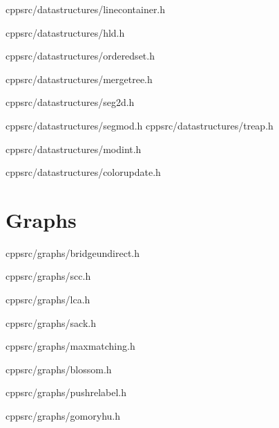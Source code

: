 \documentclass[portrait, 8pt, a4paper, oneside, twocolumn]{extarticle}
\begin{document}
    {}
    {}
    {cpp}{src/datastructures/linecontainer.h}
    \noindent\hrulefill

	{}
	{}
	{cpp}{src/datastructures/hld.h}
	\noindent\hrulefill

    {}
    {}
    {cpp}{src/datastructures/orderedset.h}
    \noindent\hrulefill

	{}
	{}
	{cpp}{src/datastructures/mergetree.h}
	\noindent\hrulefill

    
	{}
	{}
	{cpp}{src/datastructures/seg2d.h}
	\noindent\hrulefill


	{}
	{}
	{cpp}{src/datastructures/segmod.h}
	\noindent\hrulefill
    {}
    {}
    {cpp}{src/datastructures/treap.h}
    \noindent\hrulefill
	
	{}
	{}
	{cpp}{src/datastructures/modint.h}
	\noindent\hrulefill

	{}
	{}
	{cpp}{src/datastructures/colorupdate.h}
	\noindent\hrulefill

\section{Graphs}


    {}
	{}
	{cpp}{src/graphs/bridgeundirect.h}
	\noindent\hrulefill

    {}
	{}
	{cpp}{src/graphs/scc.h}
	\noindent\hrulefill


	{}
	{}
	{cpp}{src/graphs/lca.h}
	\noindent\hrulefill

	{}
	{}
	{cpp}{src/graphs/sack.h}
	\noindent\hrulefill

    {}
    {}
    {cpp}{src/graphs/maxmatching.h}
    \noindent\hrulefill

    {}
    {}
    {cpp}{src/graphs/blossom.h}
    \noindent\hrulefill

    {}
    {}
    {cpp}{src/graphs/pushrelabel.h}
    \noindent\hrulefill

    {}
    {}
    {cpp}{src/graphs/gomoryhu.h}
    \noindent\hrulefill
\end{document}
